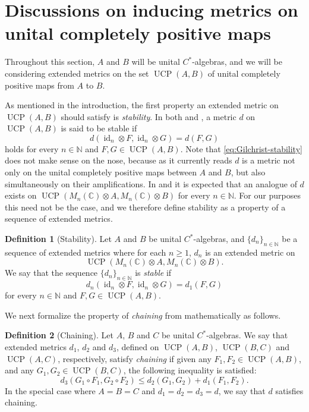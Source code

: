 \documentclass[11pt, a4paper, oneside, final, reqno]{amsart}
\newcommand{\bbN}{\mathbb{N}}
\newcommand{\bbC}{\mathbb{C}}
\newcommand{\UCP}{\operatorname{UCP}}
\newcommand{\id}{\operatorname{id}}
\theoremstyle{definition}
\newtheorem{definition}{Definition}[section]
\theoremstyle{plain}
\theoremstyle{remark}
\numberwithin{equation}{section}
\begin{document}
\section{Discussions on inducing metrics on unital completely positive maps}\label{sec:discussion-inducing-metrics}

Throughout this section, $A$ and $B$ will be unital $C^*$-algebras, and we will be considering extended metrics on the set $\UCP(A,B)$ of unital completely positive maps from $A$ to $B$. 

As mentioned in the introduction, the first property an extended metric on $\UCP(A,B)$ should satisfy is \emph{stability}. In both \cite{Gilchrist} and \cite{BorovykVellambi25}, a metric $d$ on $\UCP(A,B)$ is said to be stable if
\begin{equation}\label{eq:Gilchrist-stability}
    d(\id_n \otimes F, \id_n \otimes G) = d(F,G)
\end{equation}
holds for every $n \in \bbN$ and $F,G \in \UCP(A,B)$. Note that \eqref{eq:Gilchrist-stability} does not make sense on the nose, because as it currently reads $d$ is a metric not only on the unital completely positive maps between $A$ and $B$, but also simultaneously on their amplifications. In \cite{Gilchrist} and \cite{BorovykVellambi25} it is  expected that an analogue of $d$ exists on $\UCP(M_n(\bbC) \otimes A, M_n(\bbC) \otimes B)$ for every $n \in \bbN$. For our purposes this need not be the case, and we therefore define stability as a property of a sequence of extended metrics.

\begin{definition}[Stability]\label{def:stability}
    Let $A$ and $B$ be unital $C^*$-algebras, and $\{d_n\}_{n \in \bbN}$ be a sequence of extended metrics where for each $n\geq 1$, $d_n$ is an extended metric on
    \begin{equation*}
        \UCP(M_n(\bbC) \otimes A, M_n(\bbC) \otimes B).
    \end{equation*}
    We say that the sequence $\{d_n\}_{n \in \bbN}$ is \emph{stable} if
    \begin{equation}\label{eqn:stability}
        d_n(\id_n \otimes F, \id_n \otimes G) = d_1(F,G)
    \end{equation}
    for every $n \in \bbN$ and $F,G \in \UCP(A,B)$.
\end{definition}

We next formalize the property of \emph{chaining} from \cite{Gilchrist} mathematically as follows.
\begin{definition}[Chaining]\label{def:chaining}
    Let $A$, $B$ and $C$ be unital $C^*$-algebras. We say that extended metrics $d_1$, $d_2$ and $d_3$, defined on $\UCP(A,B)$, $\UCP(B,C)$ and $\UCP(A,C)$, respectively, satisfy \emph{chaining} if given any $F_1, F_2 \in \UCP(A,B)$, and any $G_1, G_2 \in \UCP(B,C)$, the following inequality is satisfied:
    \begin{equation}\label{eqn:chaining}
        d_3(G_1 \circ F_1, G_2 \circ F_2) \leq d_2(G_1,G_2) + d_1(F_1,F_2).
    \end{equation}
    In the special case where $A = B = C$ and $d_1 = d_2 = d_3 = d$, we say that $d$ satisfies chaining.
\end{definition}
\end{document}
